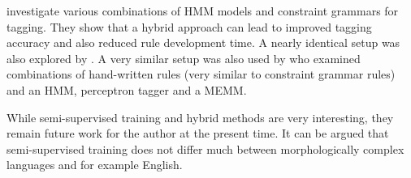 \cite{Hulden2012} investigate various combinations of HMM models and
constraint grammars for tagging. They show that a hybrid approach can
lead to improved tagging accuracy and also reduced rule development
time. A nearly identical setup was also explored by
\cite{Orosz2013}. A very similar setup was also used by
\cite{Spoustova2007} who examined combinations of hand-written rules
(very similar to constraint grammar rules) and an HMM, perceptron
tagger and a MEMM.

While semi-supervised training and hybrid methods are very
interesting, they remain future work for the author at the present
time. It can be argued that semi-supervised training does not differ
much between morphologically complex languages and for example
English.

